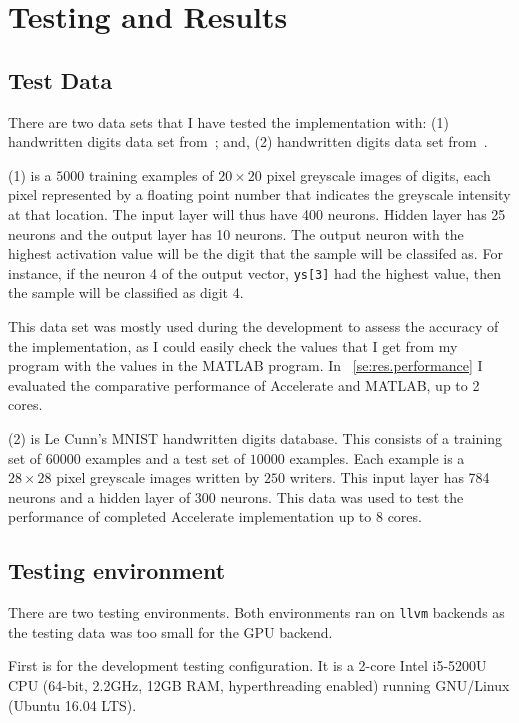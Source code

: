 \chapter{Testing and Results}\label{ch:results}

\section{Test Data}\label{se:res.testdata}
There are two data sets that I have tested the implementation with: (1) handwritten digits data set from~\cite{Ng12}; and, (2) handwritten digits data set from~\cite{LeCCorBur}.

(1) is a $5000$ training examples of $20 \times 20$ pixel greyscale images of digits, each pixel represented by a floating point number that indicates the greyscale intensity at that location. The input layer will thus have 400 neurons. Hidden layer has 25 neurons and the output layer has 10 neurons. The output neuron with the highest activation value will be the digit that the sample will be classifed as. For instance, if the neuron 4 of the output vector, \texttt{ys[3]} had the highest value, then the sample will be classified as digit 4.

This data set was mostly used during the development to assess the accuracy of the implementation, as I could easily check the values that I get from my program with the values in the MATLAB program. In ~\ref{se:res.performance} I evaluated the comparative performance of Accelerate and MATLAB, up to 2 cores.

(2) is Le Cunn's MNIST handwritten digits database. This consists of a training set of $60000$ examples and a test set of $10000$ examples. Each example is a $28 \times 28$ pixel greyscale images written by $250$ writers. This input layer has 784 neurons and a hidden layer of 300 neurons. This data was used to test the performance of completed Accelerate implementation up to 8 cores.

\section{Testing environment}\label{se:res.testsys}
There are two testing environments. Both environments ran on \texttt{llvm} backends as the testing data was too small for the GPU backend. 

First is for the development testing configuration. It is a 2-core Intel i5-5200U CPU (64-bit, 2.2GHz, 12GB RAM, hyperthreading enabled) running GNU/Linux (Ubuntu 16.04 LTS). 

